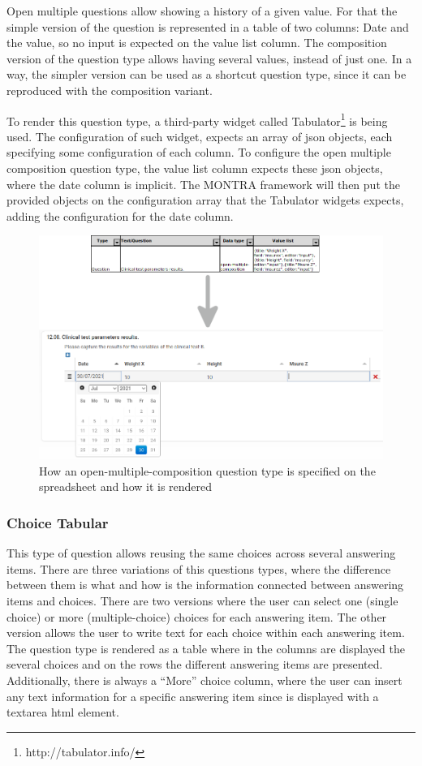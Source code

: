 Open multiple questions allow showing a history of a given value.
For that the simple version of the question is represented in a table of two columns: Date and the value, so no input is expected on the value list column.
The composition version of the question type allows having several values, instead of just one.
In a way, the simpler version can be used as a shortcut question type, since it can be reproduced with the composition variant.

To render this question type, a third-party widget called Tabulator\footnote{http://tabulator.info/} is being used.
The configuration of such widget, expects an array of \gls{json} objects, each specifying some configuration of each column.
To configure the open multiple composition question type, the value list column expects these \gls{json} objects, where the date column is implicit.
The MONTRA framework will then put the provided objects on the configuration array that the Tabulator widgets expects, adding the configuration for the date column.

\begin{figure}[h]
    \center
    \includegraphics[width=\textwidth]{open-multiple}
    \caption{How an open-multiple-composition question type is specified on the spreadsheet and how it is rendered}
    \label{fig:open-multiple}
\end{figure}

\subsubsection*{Choice Tabular}

This type of question allows reusing the same choices across several answering items.
There are three variations of this questions types, where the difference between them is what and how is the information connected between answering items and choices.
There are two versions where the user can select one (single choice) or more (multiple-choice) choices for each answering item.
The other version allows the user to write text for each choice within each answering item.
The question type is rendered as a table where in the columns are displayed the several choices and on the rows the different answering items are presented.
Additionally, there is always a ``More'' choice column, where the user can insert any text information for a specific answering item since is displayed with a textarea \gls{html} element.

